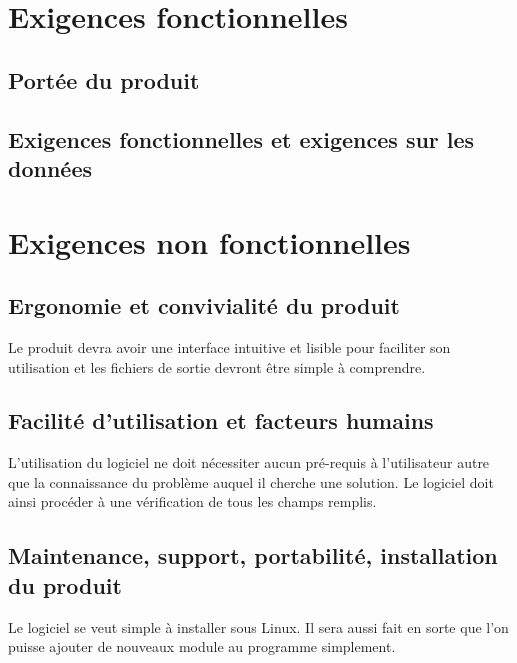 \documentclass[a4paper,11pt]{article}
\begin{document}
	\section{Exigences fonctionnelles}
		\subsection{Portée du produit}
		
		\subsection{Exigences fonctionnelles et exigences sur les données}
			
			
	\section{Exigences non fonctionnelles}
		\subsection{Ergonomie et convivialité du produit}
			Le produit devra avoir une interface intuitive et lisible pour faciliter son utilisation et les fichiers de sortie devront être simple à comprendre.
		
		\subsection{Facilité d’utilisation et facteurs humains}
			L’utilisation du logiciel ne doit nécessiter aucun pré-requis à l’utilisateur autre que la connaissance du problème auquel il cherche une solution. 
			Le logiciel doit ainsi procéder à une vérification de tous les champs remplis.
		
		\subsection{Maintenance, support, portabilité, installation du produit}
			Le logiciel se veut simple à installer sous Linux. Il sera aussi fait en sorte que l'on puisse ajouter de nouveaux module au programme simplement.  
			
\end{document}

